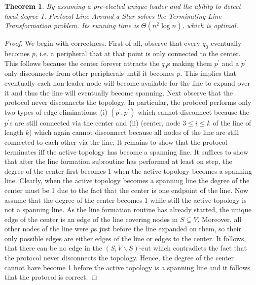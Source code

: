 \documentclass[preprint]{elsarticle}
\newcommand{\bs}{\backslash}
\newtheorem{theorem}{Theorem}
\begin{document}
\begin{theorem}
By assuming a pre-elected unique leader and the ability to detect local degree 1, Protocol Line-Around-a-Star solves the Terminating Line Transformation problem. Its running time is $\Theta(n^2 \log n)$, which is optimal.
\end{theorem}
\begin{proof}
We begin with correctness. First of all, observe that every $q_0$ eventually becomes $p$, i.e. a peripheral that at that point is only connected to the center. This follows because the center forever attracts the $q_0$s making them $p^\prime$ and a $p^\prime$ only disconnects from other peripherals until it becomes $p$. This implies that eventually each non-leader node will become available for the line to expand over it and thus the line will eventually become spanning. Next observe that the protocol never disconnects the topology. In particular, the protocol performs only two types of edge eliminations: (i) $(p^\prime,p^\prime)$ which cannot disconnect because the $p^\prime$s are still connected via the center and (ii) (center, node $3\leq i\leq k$ of the line of length $k$) which again cannot disconnect because all nodes of the line are still connected to each other via the line. It remains to show that the protocol terminates iff the active topology has become a spanning line. It suffices to show that after the line formation subroutine has performed at least on step, the degree of the center first becomes 1 when the active topology becomes a spanning line. Clearly, when the active topology becomes a spanning line the degree of the center must be 1 due to the fact that the center is one endpoint of the line. Now assume that the degree of the center becomes 1 while still the active topology is not a spanning line. As the line formation routine has already started, the unique edge of the center is an edge of the line covering nodes in $S\subsetneq V$. Moreover, all other nodes of the line were $p$s just before the line expanded on them, so their only possible edges are either edges of the line or edges to the center. It follows, that there can be no edge in the $(S,V\bs S)$-cut which contradicts the fact that the protocol never disconnects the topology. Hence, the degree of the center cannot have become 1 before the active topology is a spanning line and it follows that the protocol is correct.


\end{proof}
\end{document}
